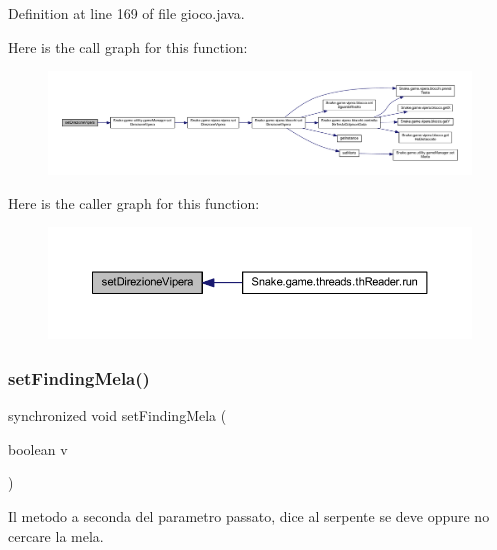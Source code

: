 Definition at line 169 of file gioco.\+java.

Here is the call graph for this function\+:
\nopagebreak
\begin{figure}[H]
\begin{center}
\leavevmode
\includegraphics[width=350pt]{class_snake_1_1game_1_1gioco_ac6bacbb78b013d51f31d65501e08522e_cgraph}
\end{center}
\end{figure}
Here is the caller graph for this function\+:
\nopagebreak
\begin{figure}[H]
\begin{center}
\leavevmode
\includegraphics[width=350pt]{class_snake_1_1game_1_1gioco_ac6bacbb78b013d51f31d65501e08522e_icgraph}
\end{center}
\end{figure}
\mbox{\label{class_snake_1_1game_1_1gioco_a4b25cde2a913ca9774e4db70bd5a584d}} 
\subsubsection{\texorpdfstring{set\+Finding\+Mela()}{setFindingMela()}}
{\footnotesize\ttfamily synchronized void set\+Finding\+Mela (\begin{DoxyParamCaption}\item[{boolean}]{v }\end{DoxyParamCaption})}



Il metodo a seconda del parametro passato, dice al serpente se deve oppure no cercare la mela. 


